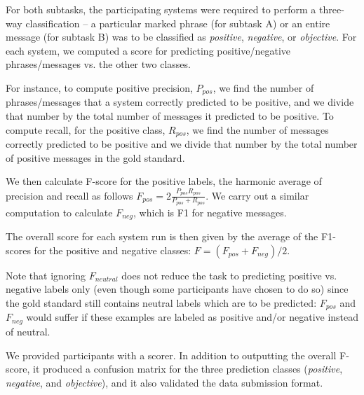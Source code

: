 
For both subtasks, the participating systems were required to perform a three-way classification -- a particular marked phrase (for subtask A) or an entire message (for subtask B) was to be classified as {\em positive}, {\em negative}, or {\em objective}.
For each system, we computed a score for predicting positive/negative phrases/messages vs. the other two classes.

For instance, to compute positive precision, $P_{pos}$, we find the number of phrases/messages that a system correctly predicted to be positive,
and we divide that number by the total number of messages it predicted to be positive.
To compute recall, for the positive class, $R_{pos}$, we find the number of messages correctly predicted to be positive and we divide that number by the total number of positive messages in the gold standard.

We then calculate F-score for the positive labels, the harmonic average of precision and recall as follows $F_{pos}= 2 \frac{P_{pos} R_{pos}}{P_{pos}+R_{pos}}$.
We carry out a similar computation to calculate $F_{neg}$, which is F1 for negative messages.

The overall score for each system run is then given by the average of the F1-scores for the positive and negative classes: $F=(F_{pos}+F_{neg})/2$.

Note that ignoring $F_{neutral}$ does not reduce the task to predicting positive vs. negative labels only (even though some participants have chosen to do so)
since the gold standard still contains neutral labels which are to be predicted:
$F_{pos}$ and $F_{neg}$ would suffer if these examples are labeled as positive and/or negative instead of neutral.

We provided participants with a scorer. In addition to outputting the overall F-score, it produced a confusion matrix for the three prediction classes ({\em positive}, {\em negative}, and {\em objective}), and it also validated the data submission format.

